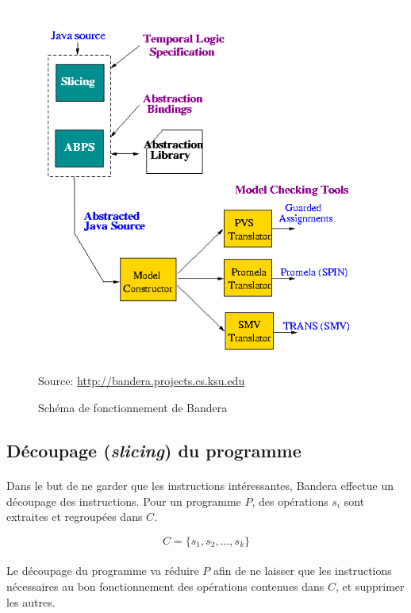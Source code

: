 \begin{figure}[H]
  \centering
  \includegraphics[scale=0.5]{images/bandera_desc.png}
  \caption{\label{fig:desc_bandera_site} Schéma de fonctionnement de Bandera}
   Source: \url{http://bandera.projects.cs.ksu.edu}
\end{figure}


\subsection{Découpage (\textit{slicing}) du programme}
\label{sec:bandera_slicing}

\paragraph{}
Dans le but de ne garder que les instructions intéressantes, Bandera
effectue un découpage des instructions. Pour un programme $P$, des
opérations $s_i$ sont extraites et regroupées dans $C$.

$$C = \{s_1, s_2, \ldots, s_k\}$$

\paragraph{}
Le découpage du programme va réduire $P$ afin de ne laisser que les
instructions nécessaires au bon fonctionnement des opérations
contenues dans $C$, et supprimer les autres.

